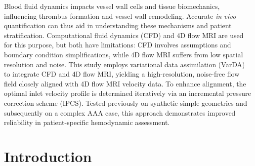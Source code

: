 Blood fluid dynamics impacts vessel wall cells and tissue biomechanics, influencing thrombus formation and vessel wall remodeling. Accurate \textit{in vivo} quantification can thus aid in understanding these mechanisms and patient stratification. Computational fluid dynamics (CFD) and 4D flow MRI are used for this purpose, but both have limitations: CFD involves assumptions and boundary condition simplifications, while 4D flow MRI suffers from low spatial resolution and noise. This study employs variational data assimilation (VarDA) to integrate CFD and 4D flow MRI, yielding a high-resolution, noise-free flow field closely aligned with 4D flow MRI velocity data. To enhance alignment, the optimal inlet velocity profile is determined iteratively via an incremental pressure correction scheme (IPCS). Tested previously on synthetic simple geometries and subsequently on a complex AAA case, this approach demonstrates improved reliability in patient-specific hemodynamic assessment.


\section*{Introduction}

